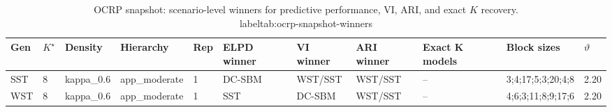 \begin{table}[!h]
\centering
\caption{OCRP snapshot: scenario-level winners for predictive performance, VI, ARI, and exact $K$ recovery.\\label{tab:ocrp-snapshot-winners}}
\centering
\begin{tabular}[t]{lllllllllll}
\toprule
Gen & $K^\star$ & Density & Hierarchy & Rep & ELPD winner & VI winner & ARI winner & Exact K models & Block sizes & $\vartheta$\\
\midrule
SST & 8 & kappa_0.6 & app_moderate & 1 & DC-SBM & WST/SST & WST/SST & -- & 3;4;17;5;3;20;4;8 & 2.20\\
WST & 8 & kappa_0.6 & app_moderate & 1 & SST & DC-SBM & WST/SST & -- & 4;6;3;11;8;9;17;6 & 2.20\\
\bottomrule
\end{tabular}
\end{table}
